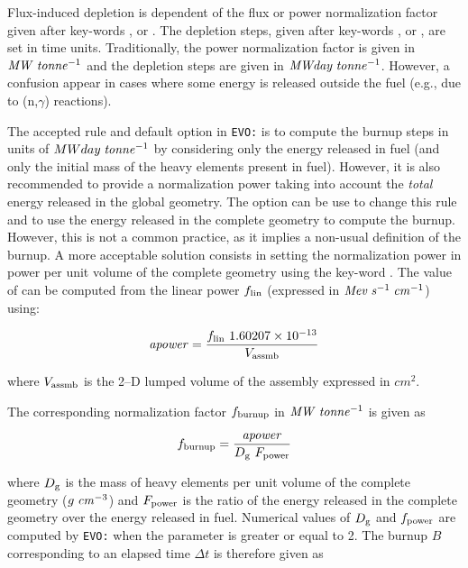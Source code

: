 Flux-induced depletion is dependent of the flux or power normalization factor
given after key-words ,  or . The depletion
steps, given after key-words ,  or , are set
in time units. Traditionally, the power normalization factor is given in
${\it MW}\;{\it tonne}^{-1}$ and the depletion steps are given in
${\it MWday}\;{\it tonne}^{-1}$. However, a confusion appear in cases where
some energy is released outside the fuel (e.g., due to (n,$\gamma$) reactions).

\vskip 0.2cm

The accepted rule and default option in {\tt EVO:} is to compute the burnup
steps in units of $MWday\;{\it tonne}^{-1}$ by considering only the energy
released in fuel (and only the initial mass of the heavy elements present
in fuel). However, it is also recommended to provide a normalization power
taking into account the {\sl total} energy released in the global geometry.
The  option can be use to change this rule and to use
the energy released in the complete geometry to compute the burnup. However,
this is not a
common practice, as it implies a non-usual definition of the burnup.
A more acceptable solution consists in setting the normalization power
in power per unit volume of the complete geometry using the key-word
. The value of  can be computed from the linear
power $f_{\rm lin}$ (expressed in ${\it Mev}\;{\it s}^{-1}\;{\it cm}^{-1}$)
using:

\begin{equation}
{\it apower}={f_{\rm lin} \ 1.60207 \times 10^{-13} \over V_{\rm assmb}}
\label{eq:eq1}
\end{equation}

\noindent where $V_{\rm assmb}$ is the 2--D lumped volume of the assembly expressed in $cm^2$.

\vskip 0.2cm

The corresponding normalization factor $f_{\rm burnup}$ in
${\it MW}\;{\it tonne}^{-1}$ is given as

\begin{equation}
f_{\rm burnup}={ {\it apower} \over D_{\rm g} \ F_{\rm power}}
\label{eq:eq2}
\end{equation}

\noindent where $D_{\rm g}$ is the mass of heavy elements per unit volume
of the complete geometry ($g\; {\it cm}^{-3}$) and $F_{\rm power}$ is the
ratio of the energy released in the complete geometry over the energy
released in fuel. Numerical values of $D_{\rm g}$ and $f_{\rm power}$ are
computed by {\tt EVO:} when the parameter  is greater or
equal to 2. The burnup $B$ corresponding to an elapsed time $\Delta t$ is
therefore given as

